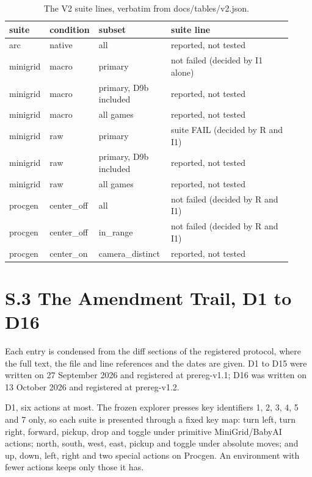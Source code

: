 \documentclass[journal,onecolumn]{IEEEtran}
\begin{document}
\begin{table}[!htbp]
\renewcommand{\thetable}{S3}
\caption{The V2 suite lines, verbatim from docs/tables/v2.json.}
\centering
\footnotesize
\renewcommand{\arraystretch}{1.15}
\setlength{\tabcolsep}{4pt}
\begin{tabular}{>{\raggedright\arraybackslash}p{0.109\linewidth}>{\raggedright\arraybackslash}p{0.133\linewidth}>{\raggedright\arraybackslash}p{0.255\linewidth}>{\raggedright\arraybackslash}p{0.424\linewidth}}
\hline
\textbf{suite} & \textbf{condition} & \textbf{subset} & \textbf{suite line} \\ \hline
arc & native & all & reported, not tested \\
minigrid & macro & primary & not failed (decided by I1 alone) \\
minigrid & macro & primary, D9b included & reported, not tested \\
minigrid & macro & all games & reported, not tested \\
minigrid & raw & primary & suite FAIL (decided by R and I1) \\
minigrid & raw & primary, D9b included & reported, not tested \\
minigrid & raw & all games & reported, not tested \\
procgen & center\_off & all & not failed (decided by R and I1) \\
procgen & center\_off & in\_range & not failed (decided by R and I1) \\
procgen & center\_on & camera\_distinct & reported, not tested \\
\hline
\end{tabular}
\end{table}

\section*{S.3 The Amendment Trail, D1 to
D16}\label{s.3-the-amendment-trail-d1-to-d16}

Each entry is condensed from the diff sections of the registered
protocol, where the full text, the file and line references and the
dates are given. D1 to D15 were written on 27 September 2026 and
registered at prereg-v1.1; D16 was written on 13 October 2026 and
registered at prereg-v1.2.

D1, six actions at most. The frozen explorer presses key identifiers 1,
2, 3, 4, 5 and 7 only, so each suite is presented through a fixed key
map: turn left, turn right, forward, pickup, drop and toggle under
primitive MiniGrid/BabyAI actions; north, south, west, east, pickup and
toggle under absolute moves; and up, down, left, right and two special
actions on Procgen. An environment with fewer actions keeps only those
it has.
\end{document}
